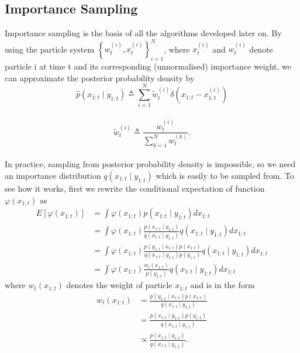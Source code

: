 \documentclass[mstat,12pt]{unswthesis}  %
\numberwithin{equation}{section}
\begin{document}
\subsection{Importance Sampling}
\noindent Importance sampling is 
the basis of all the algorithms developed later on.
By using the particle system $\left\{w_{t}^{(i)}, x_{t}^{(i)}\right\}_{i=1}^{N}$, where $x_{t}^{(i)}$ and
$w_{t}^{(i)}$ denote particle
i at time t and its corresponding (unnormalised) importance weight, we can approximate the posterior probability density by
\begin{equation}\widehat{p}\left( x_{1:t} \mid y_{1: t}\right) \triangleq \sum_{i=1}^{N} \widetilde{w}_{t}^{(i)} \delta\left( x_{1:t}-x_{1:t}^{(i)}\right)\end{equation}\\
\begin{equation}\widetilde{w}_{t}^{(i)} \triangleq \frac{w_{t}^{(i)}}{\sum_{k=1}^{N} w_{t}^{(k)}}.\end{equation}\\

\noindent In practice, sampling from posterior probability density is impossible, so we need an
importance distribution $q\left(x_{1:t} \mid y_{1:t}\right)$
which is easily to be sampled from.
To see how it works, first we rewrite  the conditional expectation of function
$\varphi(x_{1:t})$  as 
\begin{equation}\begin{aligned}
E\left[\varphi\left(x_{1:t}\right)\right]&=\int \varphi\left(x_{1:t}\right) p\left(x_{1:t} \mid y_{1:t}\right) d x_{1:t}\\
&=\int \varphi\left(x_{1:t}\right)\frac{ p\left(x_{1:t} \mid y_{1:t}\right)}{q\left(x_{1:t} \mid y_{1:t}\right)} q\left(x_{1:t} \mid y_{1:t}\right) d x_{1:t}\\
&=\int \varphi\left(x_{1:t}\right)\frac{ p\left(y_{1:t} \mid x_{1:t}\right)p\left(x_{1:t}\right)}{q\left(x_{1:t} \mid y_{1:t}\right)p\left(y_{1:t}\right)} q\left(x_{1:t} \mid y_{1:t}\right) d x_{1:t}\\
&=\int \varphi\left(x_{1:t}\right)\frac{w_{t}\left(x_{1:t}\right) }{p\left(y_{1:t} \right)} q\left(x_{1:t} \mid y_{1:t}\right) d x_{1:t}
\end{aligned}\end{equation}
where $w_{t}\left(x_{1:t}\right)$ denotes the weight of particle $x_{1:t}$ and is in the form
\begin{equation}\begin{aligned}
w_{t}\left(x_{1:t}\right)&=
\frac{ p\left(y_{1:t} \mid x_{1:t}\right)p\left(x_{1:t}\right)}{q\left(x_{1:t} \mid y_{1:t}\right)}\\
&=\frac{ p\left(x_{1:t} \mid y_{1:t}\right)p\left(y_{1:t}\right)}{q\left(x_{1:t} \mid y_{1:t}\right)}\\
&\propto \frac{ p\left(x_{1:t} \mid y_{1:t}\right)}{q\left(x_{1:t} \mid y_{1:t}\right)}.
\end{aligned}\end{equation}\\
\end{document}
